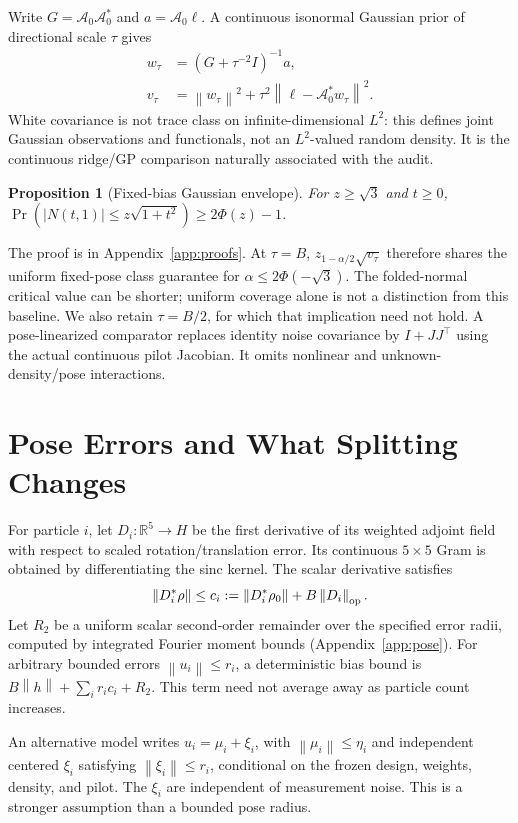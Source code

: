 \documentclass{article}
\newtheorem{proposition}{Proposition}
\newcommand{\R}{\mathbb{R}}
\newcommand{\norm}[1]{\left\|#1\right\|}
\newcommand{\A}{\mathcal A}
\begin{document}
Write $G=\A_0\A_0^*$ and $a=\A_0\ell$. A continuous isonormal Gaussian prior of directional scale $\tau$ gives
\begin{align}
w_\tau&=(G+\tau^{-2}I)^{-1}a,\label{eq:gaussianweights}\\
v_\tau&=\norm{w_\tau}^2+\tau^2\norm{\ell-\A_0^*w_\tau}^2.
\end{align}
White covariance is not trace class on infinite-dimensional $L^2$: this defines joint Gaussian observations and functionals, not an $L^2$-valued random density. It is the continuous ridge/GP comparison naturally associated with the audit.

\begin{proposition}[Fixed-bias Gaussian envelope]\label{prop:normal}
For $z\ge\sqrt3$ and $t\ge0$, $\Pr(|N(t,1)|\le z\sqrt{1+t^2})\ge2\Phi(z)-1$.
\end{proposition}
The proof is in Appendix~\ref{app:proofs}. At $\tau=B$, $z_{1-\alpha/2}\sqrt{v_\tau}$ therefore shares the uniform fixed-pose class guarantee for $\alpha\le2\Phi(-\sqrt3)$. The folded-normal critical value can be shorter; uniform coverage alone is not a distinction from this baseline. We also retain $\tau=B/2$, for which that implication need not hold. A pose-linearized comparator replaces identity noise covariance by $I+JJ^\top$ using the actual continuous pilot Jacobian. It omits nonlinear and unknown-density/pose interactions.

\section{Pose Errors and What Splitting Changes}
For particle $i$, let $D_i:\R^5\to H$ be the first derivative of its weighted adjoint field with respect to scaled rotation/translation error. Its continuous $5\times5$ Gram is obtained by differentiating the sinc kernel. The scalar derivative satisfies
\begin{equation}
\norm{D_i^*\rho}\le c_i:=\norm{D_i^*\rho_0}+B\norm{D_i}_{\rm op}.
\end{equation}
Let $R_2$ be a uniform scalar second-order remainder over the specified error radii, computed by integrated Fourier moment bounds (Appendix~\ref{app:pose}). For arbitrary bounded errors $\norm{u_i}\le r_i$, a deterministic bias bound is $B\norm h+\sum_i r_i c_i+R_2$. This term need not average away as particle count increases.

An alternative model writes $u_i=\mu_i+\xi_i$, with $\norm{\mu_i}\le\eta_i$ and independent centered $\xi_i$ satisfying $\norm{\xi_i}\le r_i$, conditional on the frozen design, weights, density, and pilot. The $\xi_i$ are independent of measurement noise. This is a stronger assumption than a bounded pose radius.
\end{document}

